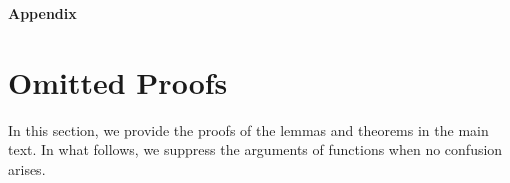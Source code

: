 \documentclass[11pt, a4paper]{article}
\theoremstyle{remark}
\newcommand{\appendixsection}{%
  \setcounter{section}{0}%
  \renewcommand{\thesection}{\Alph{section}}%
  \renewcommand{\thetheorem}{\Alph{section}.\arabic{theorem}}%
  \renewcommand{\thelemma}{\Alph{section}.\arabic{lemma}}%
  \renewcommand{\theproposition}{\Alph{section}.\arabic{proposition}}%
  \renewcommand{\thecorollary}{\Alph{section}.\arabic{corollary}}%
  \renewcommand{\thedefinition}{\Alph{section}.\arabic{definition}}%
}
\begin{document}




\newpage
\appendix
\appendixsection
{}

\begin{center}
\huge\textbf{Appendix}
\end{center}
\vspace{1mm}

\section{Omitted Proofs}\label{appendix:proof}
In this section, we provide the proofs of the lemmas and theorems in the main text.
In what follows, we suppress the arguments of functions when no confusion arises.
\end{document}
